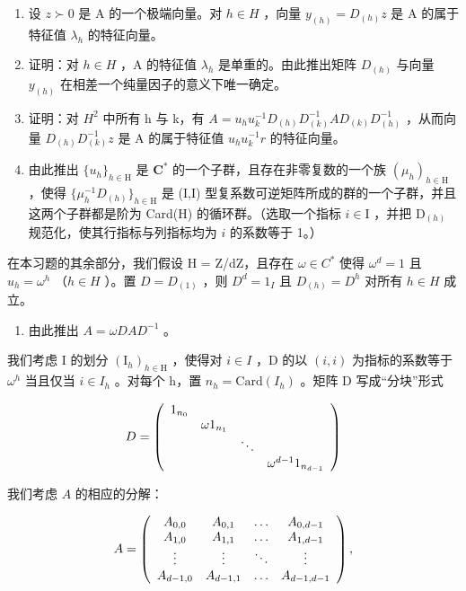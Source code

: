 \begin{enumerate}
\def\labelenumi{\alph{enumi})}
\item
  设 \(z \succ 0\) 是 A 的一个极端向量。对 \(h \in H\) ，向量 \(y_{(h)} = D_{(h)}z\) 是 A 的属于特征值 \(\lambda_{h}\) 的特征向量。
\item
  证明：对 \(h \in H\) ，A 的特征值 \(\lambda_{h}\) 是单重的。由此推出矩阵 \(D_{(h)}\) 与向量 \(y_{(h)}\) 在相差一个纯量因子的意义下唯一确定。
\item
  证明：对 \(H^{2}\) 中所有 h 与 k，有 \(A = u_{h}u_{k}^{-1}D_{(h)}D_{(k)}^{-1}AD_{(k)}D_{(h)}^{-1}\) ，从而向量 \(D_{(h)}D_{(k)}^{-1}z\) 是 A 的属于特征值 \(u_{h}u_{k}^{-1}r\) 的特征向量。
\item
  由此推出 \(\{u_h\}_{h\in \mathrm{H}}\) 是 \(\mathbf{C}^*\) 的一个子群，且存在非零复数的一个族 \((\mu_h)_{h\in \mathrm{H}}\) ，使得 \(\{\mu_h^{-1}D_{(h)}\}_{h\in \mathrm{H}}\) 是 (I,I) 型复系数可逆矩阵所成的群的一个子群，并且这两个子群都是阶为 Card(H) 的循环群。（选取一个指标 \(i\in \mathrm{I}\) ，并把 \(\mathrm{D}_{(h)}\) 规范化，使其行指标与列指标均为 \(i\) 的系数等于 1。）
\end{enumerate}

在本习题的其余部分，我们假设 H = Z/dZ，且存在 \(\omega \in C^{*}\) 使得 \(\omega^{d} = 1\) 且 \(u_{h} = \omega^{h}\) （\(h \in H\) ）。置 \(D = D_{(1)}\) ，则 \(D^{d} = 1_{I}\) 且 \(D_{(h)} = D^{h}\) 对所有 \(h \in H\) 成立。

\begin{enumerate}
\def\labelenumi{\alph{enumi})}
\setcounter{enumi}{4}
\tightlist
\item
  由此推出 \(A = \omega DAD^{-1}\) 。
\end{enumerate}

我们考虑 I 的划分 \((\mathrm{I}_{h})_{h\in\mathrm{H}}\) ，使得对 \(i\in I\) ，D 的以 \((i,i)\) 为指标的系数等于 \(\omega^{h}\) 当且仅当 \(i\in I_{h}\) 。对每个 h，置 \(n_{h}=\mathrm{Card}(I_{h})\) 。矩阵 D 写成“分块”形式

\[
D = \left( \begin{array}{c c c c} 1 _ {n _ {0}} & & & \\ & \omega 1 _ {n _ {1}} & & \\ & & \ddots & \\ & & & \omega^ {d - 1} 1 _ {n _ {d - 1}} \end{array} \right)
\]

我们考虑 \(A\) 的相应的分解：

\[
A = \left( \begin{array}{c c c c} A _ {0, 0} & A _ {0, 1} & \dots & A _ {0, d - 1} \\ A _ {1, 0} & A _ {1, 1} & \dots & A _ {1, d - 1} \\ \vdots & \vdots & \ddots & \vdots \\ A _ {d - 1, 0} & A _ {d - 1, 1} & \dots & A _ {d - 1, d - 1} \end{array} \right),
\]

